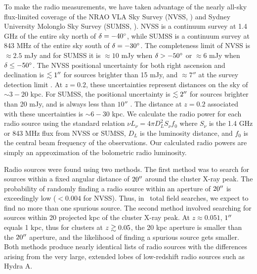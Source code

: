 \documentclass{emulateapj}
\begin{document}
To make the radio measurements, we have taken advantage of the nearly
all-sky flux-limited coverage of the NRAO VLA Sky Survey (NVSS,
\citealt{nvss}) and Sydney University Molonglo Sky Survey (SUMSS,
\citealt{sumss1, sumss2}). NVSS is a continuum survey at 1.4 GHz of
the entire sky north of $\delta = -40\mbox{$^\circ$}$, while SUMSS is a
continuum survey at 843 MHz of the entire sky south of $\delta =
-30\mbox{$^\circ$}$. The completeness limit of NVSS is $\approx 2.5$ mJy and for
SUMSS it is $\approx 10$ mJy when $\delta > -50\mbox{$^\circ$}$ or $\approx 6$
mJy when $\delta \leq -50\mbox{$^\circ$}$. The NVSS positional uncertainty for
both right ascension and declination is $\lesssim 1''$ for sources brighter
than 15 mJy, and $\approx 7''$ at the survey detection limit
\citep{nvss}. At $z=0.2$, these uncertainties represent distances on
the sky of $\sim3-20$ kpc. For SUMSS, the positional uncertainty is
$\lesssim 2''$ for sources brighter than 20 mJy, and is always less than
$10''$ \citep{sumss1,sumss2}. The distance at $z=0.2$ associated with
these uncertainties is $\sim6-30$ kpc. We calculate the radio power
for each radio source using the standard relation $\nu L_{\nu} = 4 \pi
D_L^2 S_{\nu} f_0$ where $S_{\nu}$ is the 1.4 GHz or 843 MHz flux from
NVSS or SUMSS, $D_L$ is the luminosity distance, and $f_0$ is the
central beam frequency of the observations. Our calculated radio
powers are simply an approximation of the bolometric radio luminosity.

Radio sources were found using two methods. The first method was to
search for sources within a fixed angular distance of $20\mbox{$^{\prime\prime}$}$
around the cluster X-ray peak. The probability of randomly finding a
radio source within an aperture of $20\mbox{$^{\prime\prime}$}$ is exceedingly low ($<
0.004$ for NVSS). Thus, in \clnum\ total field searches, we expect to
find no more than one spurious source. The second method involved
searching for sources within 20 projected kpc of the cluster X-ray
peak. At $z \approx 0.051$, $1\mbox{$^{\prime\prime}$}$ equals 1 kpc, thus for clusters
at $z \gtrsim 0.05$, the 20 kpc aperture is smaller than the $20\mbox{$^{\prime\prime}$}$
aperture, and the likelihood of finding a spurious source gets
smaller. Both methods produce nearly identical lists of radio sources
with the differences arising from the very large, extended lobes of
low-redshift radio sources such as Hydra A.
\end{document}
